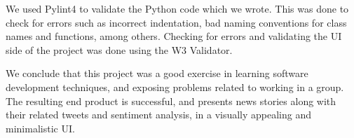 \documentclass[a4paper]{article}
\begin{document}
	We used Pylint4 to validate the Python code which we wrote. This was done to check for errors such as incorrect indentation, bad naming conventions for class names and functions, among others. Checking for errors and validating the UI side of the project was done using the W3 Validator.
	
	We conclude that this project was a good exercise in learning software development techniques, and exposing problems related to working in a group. The resulting end product is successful, and presents news stories along with their related tweets and sentiment analysis, in a visually appealing and minimalistic UI.
  
\end{document}

